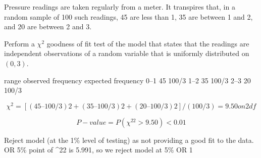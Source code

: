 \documentclass[a4paper,12pt]{article}
\begin{document}
Pressure readings are taken regularly from a meter. It transpires that, in a random sample of 100 such readings, 45 are less than 1, 35 are between 1 and 2, and 20 are between 2 and 3.


Perform a $\chi^2$ goodness of fit test of the model that states that the readings are independent observations of a random variable that is uniformly distributed on $(0, 3)$.

\newpage

range
observed frequency
expected frequency
0–1
45
100/3
1–2
35
100/3
2–3
20
100/3

\[ \chi^2 = [(45 – 100/3) 2 + (35 – 100/3) 2 + (20 – 100/3) 2 ]/(100/3) = 9.50 on 2df\]

\[P-value = P ( \chi^22 > 9.50) < 0.01\]

Reject model (at the 1\% level of testing) as not providing a good fit to the data.
OR 5\% point of \chi^22 is 5.991, so we reject model at 5\%
OR 1%
\end{document}

